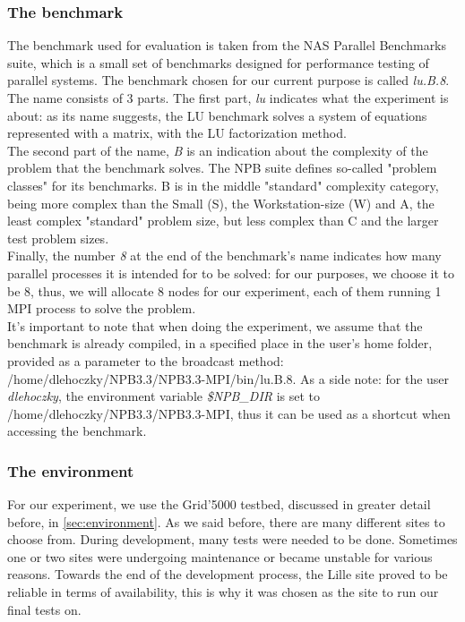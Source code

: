 \subsubsection{The benchmark}
The benchmark used for evaluation is taken from the NAS Parallel
Benchmarks suite\cite{jfy99}, which is a small set of benchmarks
designed for performance testing of parallel systems. The benchmark
chosen for our current purpose is called \emph{lu.B.8}. The name
consists of 3 parts. The first part, \emph{lu} indicates what the
experiment is about: as its name suggests, the LU benchmark solves a
system of equations represented with a matrix, with the LU
factorization method.\\
The second part of the name, \emph{B} is an
indication about the complexity of the problem that the benchmark
solves. The NPB suite defines so-called "problem classes" for its
benchmarks. B is in the middle "standard" complexity category, being
more complex than the Small (S), the Workstation-size (W) and A, the
least complex "standard" problem size, but less complex than C and the
larger test problem sizes.\cite{d13}\\
Finally, the number \emph{8} at the end of the benchmark's name
indicates how many parallel processes it is intended for to be solved:
for our purposes, we choose it to be 8, thus, we will allocate 8 nodes
for our experiment, each of them running 1 MPI process to solve the
problem.\\
It's important to note that when doing the experiment, we assume that
the benchmark is already compiled, in a specified place in the user's
home folder, provided as a parameter to the broadcast method:
/home/dlehoczky/NPB3.3/NPB3.3-MPI/bin/lu.B.8. As a side note: for the
user \emph{dlehoczky}, the environment variable \emph{\$NPB\_DIR} is
set to /home/dlehoczky/NPB3.3/NPB3.3-MPI, thus it can be used as a
shortcut when accessing the benchmark.
\subsubsection{The environment}
For our experiment, we use the Grid'5000 testbed, discussed in greater
detail before, in \ref{sec:environment}. As we said before, there are
many different sites to choose from. During development,
many tests were needed to be done. Sometimes one or two sites were
undergoing maintenance or became unstable for various reasons. Towards
the end of the development process, the Lille site proved to be
reliable in terms of availability, this is why it was chosen as the
site to run our final tests on.

